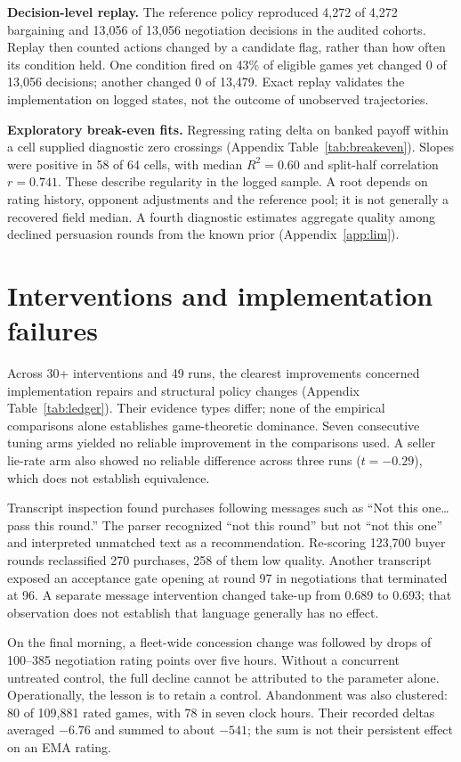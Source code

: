 \textbf{Decision-level replay.} The reference policy reproduced 4,272 of 4,272
bargaining and 13,056 of 13,056 negotiation decisions in the audited cohorts.
Replay then counted actions changed by a candidate flag, rather than how often
its condition held. One condition fired on 43\% of eligible games yet changed
0 of 13,056 decisions; another changed 0 of 13,479. Exact replay validates the
implementation on logged states, not the outcome of unobserved trajectories.

\textbf{Exploratory break-even fits.} Regressing rating delta on banked payoff
within a cell supplied diagnostic zero crossings (Appendix
Table~\ref{tab:breakeven}). Slopes were positive in 58 of 64 cells, with median
$R^2=0.60$ and split-half correlation $r=0.741$. These describe regularity in
the logged sample. A root depends on rating history, opponent adjustments and
the reference pool; it is not generally a recovered field median. A fourth
diagnostic estimates aggregate quality among declined persuasion rounds from
the known prior (Appendix~\ref{app:lim}).

\section{Interventions and implementation failures}
Across 30+ interventions and 49 runs, the clearest improvements concerned
implementation repairs and structural policy changes (Appendix
Table~\ref{tab:ledger}). Their evidence types differ; none of the empirical
comparisons alone establishes game-theoretic dominance. Seven consecutive tuning
arms yielded no reliable improvement in the comparisons used. A seller lie-rate
arm also showed no reliable difference across three runs ($t=-0.29$), which does
not establish equivalence.

Transcript inspection found purchases following messages such as ``Not this
one\ldots pass this round.'' The parser recognized ``not this round'' but not
``not this one'' and interpreted unmatched text as a recommendation. Re-scoring
123,700 buyer rounds reclassified 270 purchases, 258 of them low quality.
Another transcript exposed an acceptance gate opening at round 97 in negotiations
that terminated at 96. A separate message intervention changed take-up from
0.689 to 0.693; that observation does not establish that language generally has
no effect.

On the final morning, a fleet-wide concession change was followed by drops of
100--385 negotiation rating points over five hours. Without a concurrent
untreated control, the full decline cannot be attributed to the parameter alone.
Operationally, the lesson is to retain a control. Abandonment was also clustered:
80 of 109,881 rated games, with 78 in seven clock hours. Their recorded deltas
averaged $-6.76$ and summed to about $-541$; the sum is not their persistent
effect on an EMA rating.


